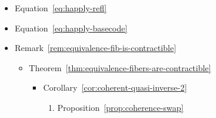 \begin{rem}
{\begin{itemize}[label=$\diamond$]
\begin{itemize}[label=$\triangleright$]
\begin{itemize}[label=$\star$]
\begin{itemize}[label=$\circ$]
\begin{enumerate}[label=$\scriptstyle\bullet$]
\begin{enumerate}[label=$\scriptstyle-$]
                    \end{enumerate}
                \end{enumerate}
            \end{itemize}
            \item {}
            \begin{itemize}[label=$\circ$]
                \item {}
            \end{itemize}
            \item Theorem~\ref{thm:isContr->ishae}
            \begin{itemize}[label=$\circ$]
                \item Lemma~\ref{lem:fib-equality}
                \begin{enumerate}[label=$\scriptstyle\bullet$]
                    \item {}
                \end{enumerate}
            \end{itemize}
            \item Lemma~\ref{lem:base-equivalence-implies-bundle-equivalence} (\UA)
        \end{itemize}
        \item Equation~\eqref{eq:happly-refl}
        \item Equation~\eqref{eq:happly-basecode}
        \item Remark~\ref{rem:equivalence-fib-is-contractible}
        \begin{itemize}
            \item Theorem~\ref{thm:equivalence-fibers-are-contractible}
            \begin{itemize}[label=$\circ$]
                \item Corollary~\ref{cor:coherent-quasi-inverse-2}
                \begin{enumerate}[label=$\scriptstyle\bullet$]
                    \item Proposition~\ref{prop:coherence-swap}

\end{enumerate}
\end{itemize}
\end{itemize}
\end{itemize}
\end{itemize}}
\end{rem}
